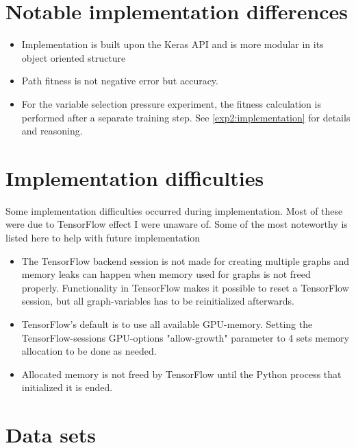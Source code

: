 \section{Notable implementation differences}
\begin{itemize}
    \item Implementation is built upon the Keras API and is more modular in its object oriented structure
    \item Path fitness is not negative error but accuracy. 
    \item For the variable selection pressure experiment, the fitness calculation is performed after a separate training step. See \ref{exp2:implementation} for details and reasoning.
\end{itemize}

\section{Implementation difficulties} 
\label{implementation:problems}
Some implementation difficulties occurred during implementation. Most of these were due to TensorFlow effect I were unaware of. Some of the most noteworthy is listed here to help with future implementation
\begin{itemize}
    \item The TensorFlow backend session is not made for creating multiple graphs and memory leaks can happen when memory used for graphs is not freed properly. Functionality in TensorFlow makes it possible to reset a TensorFlow session, but all graph-variables has to be reinitialized afterwards. 
    \item TensorFlow's default is to use all available GPU-memory. Setting the TensorFlow-sessions GPU-options "allow-growth" parameter to 4 sets memory allocation to be done as needed.
    \item Allocated memory is not freed by TensorFlow until the Python process that initialized it is ended.
\end{itemize}

\section{Data sets}
